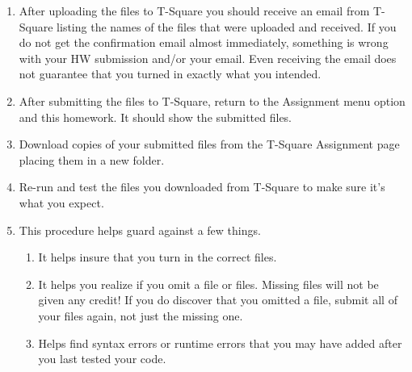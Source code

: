\documentclass[12pt]{article}
\begin{document}
\begin{enumerate}
\itemsep0em
\item After uploading the files to T-Square you should receive an email from T-Square listing the names of the files that were uploaded and received. If you do not get the confirmation email almost immediately, something is wrong with your HW submission and/or your email. Even receiving the email does not guarantee that you turned in exactly what you intended.
\item After submitting the files to T-Square, return to the Assignment menu option and this homework. It should show the submitted files.
\item Download copies of your submitted files from the T-Square Assignment page placing them in a new folder.
\item Re-run and test the files you downloaded from T-Square to make sure it's what you expect.
\item This procedure helps guard against a few things.
\begin{enumerate}
\itemsep0em
\item It helps insure that you turn in the correct files.
\item It helps you realize if you omit a file or files. Missing files will not be given any credit! If you do discover that you omitted a file, submit all of your files again, not just the missing one.
\item Helps find syntax errors or runtime errors that you may have added after you last tested your code.
\end{enumerate}
\end{enumerate}
\end{document}
